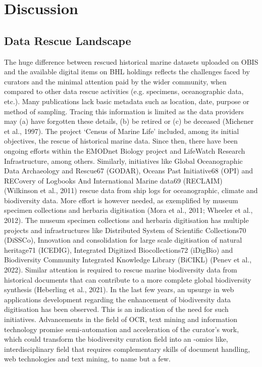\section{Discussion}
\label{sec:deco-discussion}

   \subsection{Data Rescue Landscape}
   The huge difference between rescued historical marine datasets uploaded on OBIS and the available digital items on BHL holdings reflects the challenges faced by curators and the minimal attention paid by the wider community, when compared to other data rescue activities (e.g. specimens, oceanographic data, etc.). Many publications lack basic metadata such as location, date, purpose or method of sampling. Tracing this information is limited as the data providers may (a) have forgotten these details, (b) be retired or (c) be deceased (Michener et al., 1997).
The project ‘Census of Marine Life’ included, among its initial objectives, the rescue of historical marine data. Since then, there have been ongoing efforts within the EMODnet Biology project and LifeWatch Research Infrastructure, among others. Similarly, initiatives like Global Oceanographic Data Archaeology and Rescue67 (GODAR), Oceans Past Initiative68 (OPI) and RECovery of Logbooks And International Marine data69 (RECLAIM) (Wilkinson et al., 2011) rescue data from ship logs for oceanographic, climate and biodiversity data. More effort is however needed, as exemplified by museum specimen collections and herbaria digitisation (Mora et al., 2011; Wheeler et al., 2012). The museum specimen collections and herbaria digitisation has multiple projects and infrastructures like Distributed System of Scientific Collections70 (DiSSCo), Innovation and consolidation for large scale digitisation of natural heritage71 (ICEDIG), Integrated Digitized Biocollections72 (iDigBio) and Biodiversity Community Integrated Knowledge Library (BiCIKL) (Penev et al., 2022). Similar attention is required to rescue marine biodiversity data from historical documents that can contribute to a more complete global biodiversity synthesis (Heberling et al., 2021).
In the last few years, an upsurge in web applications development regarding the enhancement of biodiversity data digitisation has been observed. This is an indication of the need for such initiatives. Advancements in the field of OCR, text mining and information technology promise semi-automation and acceleration of the curator’s work, which could transform the biodiversity curation field into an -omics like, interdisciplinary field that requires complementary skills of document handling, web technologies and text mining, to name but a few.

